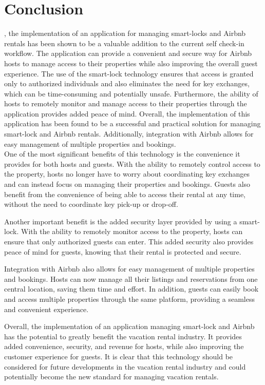 \chapter{Conclusion}
\label{cap:conclusion}

, the implementation of an application for managing smart-locks and Airbnb rentals has been shown to be a valuable addition to the current self check-in workflow. The application can provide a convenient and secure way for Airbnb hosts to manage access to their properties while also improving the overall guest experience. The use of the smart-lock technology ensures that access is granted only to authorized individuals and also eliminates the need for key exchanges, which can be time-consuming and potentially unsafe. Furthermore, the ability of hosts to remotely monitor and manage access to their properties through the application provides added peace of mind. Overall, the implementation of this application has been found to be a successful and practical solution for managing smart-lock and Airbnb rentals. Additionally, integration with Airbnb allows for easy management of multiple properties and bookings.
\\ One of the most significant benefits of this technology is the convenience it provides for both hosts and guests. With the ability to remotely control access to the property, hosts no longer have to worry about coordinating key exchanges and can instead focus on managing their properties and bookings. Guests also benefit from the convenience of being able to access their rental at any time, without the need to coordinate key pick-up or drop-off.

Another important benefit is the added security layer provided by using a smart-lock. With the ability to remotely monitor access to the property, hosts can ensure that only authorized guests can enter. This added security also provides peace of mind for guests, knowing that their rental is protected and secure.

Integration with Airbnb also allows for easy management of multiple properties and bookings. Hosts can now manage all their listings and reservations from one central location, saving them time and effort. In addition, guests can easily book and access multiple properties through the same platform, providing a seamless and convenient experience.

Overall, the implementation of an application managing smart-lock and Airbnb has the potential to greatly benefit the vacation rental industry. It provides added convenience, security, and revenue for hosts, while also improving the customer experience for guests. It is clear that this technology should be considered for future developments in the vacation rental industry and could potentially become the new standard for managing vacation rentals.

